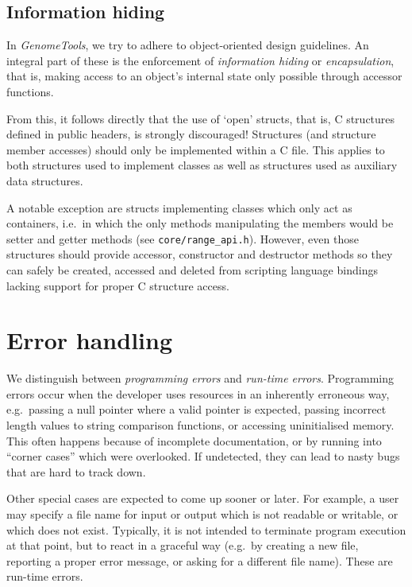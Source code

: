 \documentclass[11pt,final]{article}
\newcommand{\keyword}[1]{\lstinline{#1}}
\newcommand{\Gt}[0]{\emph{GenomeTools}\xspace}
\begin{document}
\subsection{Information hiding}
In \Gt, we try to adhere to object-oriented design guidelines. An integral
part of these is the enforcement of \emph{information hiding} or
\emph{encapsulation}, that is, making access to an object's internal state
only possible through accessor functions.

From this, it follows directly that the use of `open' structs, that is, C
structures defined in public headers, is strongly discouraged! Structures (and
structure member accesses) should only be implemented within a C file. This
applies to both structures used to implement classes as well as structures used
as auxiliary data structures.

A notable exception are structs implementing classes which only act as
containers, i.e.\ in which the only methods manipulating the members would be
setter and getter methods (see \keyword{core/range_api.h}).
However, even those structures should provide accessor, constructor and
destructor methods so they can safely be created, accessed and deleted from
scripting language bindings lacking support for proper C structure access.



\section{Error handling}
We distinguish between \emph{programming errors} and \emph{run-time errors}.
Programming errors occur when the developer uses resources in an inherently
erroneous way, e.g.\ passing a null pointer where a valid pointer is expected,
passing incorrect length values to string comparison functions, or accessing
uninitialised memory. This often happens because of incomplete documentation,
or by running into ``corner cases'' which were overlooked. If undetected, they
can lead to nasty bugs that are hard to track down.

Other special cases are expected to come up sooner or later. For example, a user
may specify a file name for input or output which is not readable or writable,
or which does not exist. Typically, it is not intended to terminate program
execution at that point, but to react in a graceful way (e.g.\ by creating a
new file, reporting a proper error message, or asking for a different file name).
These are run-time errors.
\end{document}
